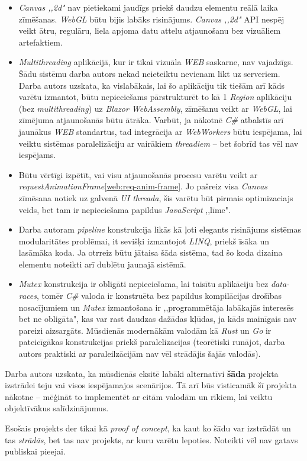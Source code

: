 \begin{itemize}
    \item \emph{Canvas ,,2d"} nav pietiekami jaudīgs priekš daudzu elementu reālā laika
    zīmēšanas. \emph{WebGL} būtu bijis labāks risinājums. \emph{Canvas ,,2d"} API nespēj veikt
    ātru, regulāru, liela apjoma datu attelu atjaunošanu bez vizuāliem artefaktiem.

    \item \emph{Multithreading} aplikācijā, kur ir tikai vizuāla \emph{WEB} saskarne, nav vajadzīgs.
    Šādu sistēmu darba autors nekad neieteiktu nevienam likt uz serveriem.
    Darba autors uzskata, ka vislabākais, lai šo aplikāciju tik tiešām arī kāds
    varētu izmantot, būtu nepieciešams pārstrukturēt to kā 1 \emph{Region} aplikāciju
    (bez \emph{multithreading}) uz \emph{Blazor WebAssembly}, zīmēšanu veikt ar
    \emph{WebGL}, lai zīmējuma atjaunošanās būtu ātrāka. Varbūt, ja nākotnē \emph{C\#}
    atbalstīs arī jaunākus \emph{WEB} standartus, tad integrācija ar
    \emph{WebWorkers} būtu iespējama, lai veiktu sistēmas paralelizāciju ar vairākiem
    \emph{threadiem} -- bet šobrīd tas vēl nav iespējams.

    \item Būtu vērtīgi izpētīt, vai visu atjaunošanās procesu varētu veikt ar
    \emph{requestAnimationFrame}\ref{web:req-anim-frame}. Jo pašreiz visa \emph{Canvas}
    zīmēsana notiek uz galvenā \emph{UI threada}, šis varētu būt pirmais
    optimizaciajs veids, bet tam ir nepieciešama papildus \emph{JavaScript} ,,līme".

    \item Darba autoram \emph{pipeline} konstrukcija likās kā ļoti elegants risinājums
    sistēmas modularitātes problēmai, it sevišķi izmantojot \emph{LINQ}, priekš īsāka un lasāmāka
    koda. Ja otrreiz būtu jātaisa šāda sistēma, tad šo koda dizaina elementu
    noteikti arī dublētu jaunajā sistēmā.

    \item \emph{Mutex} konstrukcija ir obligāti nepieciešama, lai taisītu aplikāciju
    bez \emph{data-races}, tomēr \emph{C\#} valoda ir konstruēta bez papildus kompilācijas
    drošības nosacījumiem un \emph{Mutex} izmantošana ir ,,programmētāja labākajās
    interesēs bet ne obligāta", kas var rast daudzas dažādas kļūdas, ja kāds mainīgais
    nav pareizi aizsargāts. Mūsdienās modernākām valodām kā \emph{Rust} un \emph{Go}
    ir pateicīgākas konstrukcijas priekš paralelizacijas (teorētiski runājot,
    darba autors praktiski ar paraleilzācijām nav vēl strādājis šajās valodās).
\end{itemize}

Darba autors uzskata, ka mūsdienās eksitē labāki alternatīvi \textbf{šāda} projekta
izstrādei teju vai visos iespējamajos scenārijos. Tā arī būs visticamāk šī
projekta nākotne -- mēģināt to implementēt ar citām valodām un rīkiem, lai veiktu objektīvākus
salīdzinājumus.

Esošais projekts der tikai kā \emph{proof of concept}, ka kaut ko šādu var izstrādāt
un tas \emph{strādās}, bet tas nav projekts, ar kuru varētu lepoties. Noteikti vēl
nav gatavs publiskai pieejai.
